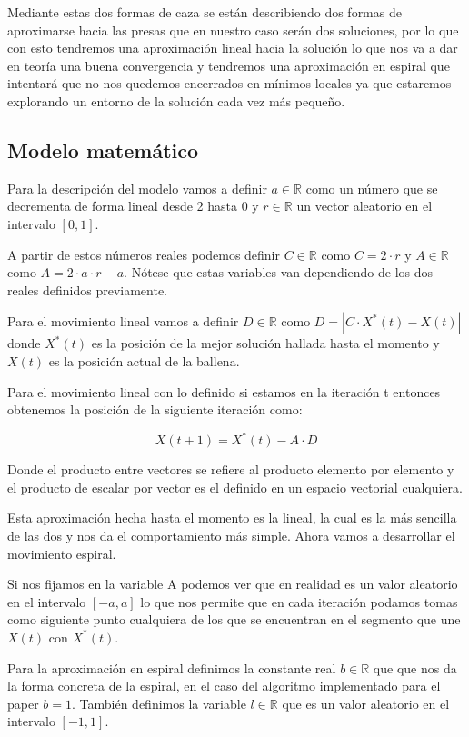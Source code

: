 \documentclass[12pt,a4paper]{article}
\begin{document}
		Mediante estas dos formas de caza se están describiendo dos formas de aproximarse hacia las presas que en nuestro caso serán dos soluciones, por lo que con esto tendremos una aproximación lineal hacia la solución lo que nos va a dar en teoría una buena convergencia y tendremos una aproximación en espiral que intentará que no nos quedemos encerrados en mínimos locales ya que estaremos explorando un entorno de la solución cada vez más pequeño.
	
	\subsection{Modelo matemático}
	
		Para la descripción del modelo vamos a definir $a\in \mathbb{R}$ como un número que se decrementa de forma lineal desde 2 hasta 0 y $r\in \mathbb{R}$ un vector aleatorio en el intervalo $[0,1]$.
		
		A partir de estos números reales podemos definir $C\in \mathbb{R}$ como $C=2\cdot r$ y $A \in \mathbb{R}$ como $A = 2\cdot a \cdot r - a$. Nótese que estas variables van dependiendo de los dos reales definidos previamente.
		
		Para el movimiento lineal vamos a definir $D\in \mathbb{R}$ como $D=|C\cdot X^*(t)-X(t)|$ donde $X^*(t)$ es la posición de la mejor solución hallada hasta el momento y $X(t)$ es la posición actual de la ballena.
		
		Para el movimiento lineal con lo definido si estamos en la iteración t entonces obtenemos la posición de la siguiente iteración como:
		
		$$X(t+1) = X^*(t)-A\cdot D$$
		
		Donde el producto entre vectores se refiere al producto elemento por elemento y el producto de escalar por vector es el definido en un espacio vectorial cualquiera.
		
		Esta aproximación hecha hasta el momento es la lineal, la cual es la más sencilla de las dos y nos da el comportamiento más simple. Ahora vamos a desarrollar el movimiento espiral.
		
		Si nos fijamos en la variable A podemos ver que en realidad es un valor aleatorio en el intervalo $[-a,a]$ lo que nos permite que en cada iteración podamos tomas como siguiente punto cualquiera de los que se encuentran en el segmento que une $X(t)$ con $X^*(t)$.
		
		Para la aproximación en espiral definimos la constante real $b\in \mathbb{R}$ que que nos da la forma concreta de la espiral, en el caso del algoritmo implementado para el paper $b=1$. También definimos la variable $l\in \mathbb{R}$ que es un valor aleatorio en el intervalo $[-1,1]$.
		
\end{document}
